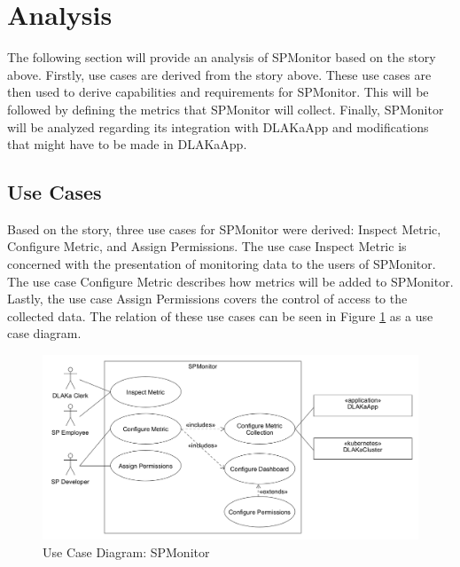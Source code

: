 \section{Analysis}
\label{sec:analysis}

The following section will provide an analysis of SPMonitor based on the
story above. Firstly, use cases are derived from the story above.
These use cases are then used to derive capabilities and requirements for
SPMonitor. This will be followed by defining the metrics that SPMonitor will
collect. Finally, SPMonitor will be analyzed regarding its integration with
DLAKaApp and modifications that might have to be made in DLAKaApp.

\subsection{Use Cases}

Based on the story, three use cases for SPMonitor were derived: Inspect
Metric, Configure Metric, and Assign Permissions. The use case Inspect Metric
is concerned with the presentation of monitoring data to the users of
SPMonitor. The use case Configure Metric describes how metrics will be added to
SPMonitor. Lastly, the use case Assign Permissions covers the control of access
to the collected data. The relation of these use cases can be seen in Figure
\ref{fig:use_case_diagram_spmonitor} as a use case diagram.

\begin{figure}[tb]
  \centering
  \includegraphics[width=\textwidth]{figures/2.1_use_case_spmonitor.png}
  \caption{Use Case Diagram: SPMonitor}
  \label{fig:use_case_diagram_spmonitor}
\end{figure}

